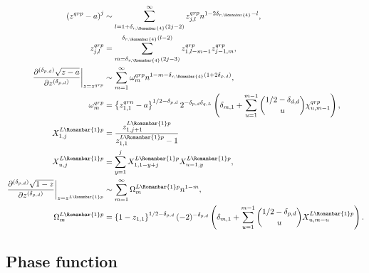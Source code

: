 \documentclass[11pt]{article}
\newcommand*{\Chi}{X}
\newcommand{\qg}{q}
\newcommand{\ql}{L}
\newcommand{\qj}{J}
\newcommand{\rg}{r}
\newcommand{\rb}{{\scriptsize \Romanbar{1}} }
\newcommand{\rl}{{\scriptsize \Romanbar{4}} }
\newcommand{\pg}{p}
\newcommand{\pn}{n}
\newcommand{\pd}{d}
\numberwithin{equation}{section}
\begin{document}
\begin{align}
	\left(z^{\qg\rg\pg} -a \right)^j & \sim \sum_{l=1 + \delta_{\rg,\rl}(2j-2)}^\infty z_{j,l}^{\qg\rg\pg} n^{1 -2\delta_{\rg,\rl} -l}, \\ %
	z_{j,l}^{\qg\rg\pg} & = \sum_{m=\delta_{\rg,\rl}(2j-3)}^{\delta_{\rg,\rl}(l-2)} z_{1,l-m-1}^{\qg\rg\pg}  z_{j-1,m}^{\qg\rg\pg}, \\
	\left.\frac{\partial^{(\delta_{\pg,\pd})} \sqrt{z-a}}{\partial z^{(\delta_{\pg,\pd})}}\right|_{z=z^{\qg\rg\pg}}   & \sim \sum_{m=1}^\infty \omega_m^{\qg\rg\pg}  n^{ 1 -m -\delta_{\rg,\rl} (1+2\delta_{\pg,\pd})}, \\ %
	\omega_m^{\qg\rg\pg} & = \left\{ z_{1,1}^{\qg\rg\pn} -a \right\}^{1/2 -\delta_{\pg,\pd}} 2^{-\delta_{\pg,\pd}\delta_{\qg,\ql} } \left( \delta_{m,1} + \sum_{u=1}^{m-1} {1/2-\delta_{\pd,\pd} \choose u} \chi_{u,m-1}^{\qg\rg\pg} \right), \\ %
	\Chi_{1,j}^{\ql\rb\pg} & = \frac{z_{1,j+1}^{\ql\rb\pg}}{z_{1,1}^{\ql\rb\pg}-1} \\
	\Chi_{u,j}^{\ql\rb\pg} & = \sum_{y=1}^{j} \Chi_{1,1-y+j}^{\ql\rb\pg} \Chi_{u-1,y}^{\ql\rb\pg}, \\
	\left.\frac{\partial^{(\delta_{\pg,\pd})} \sqrt{1-z} }{\partial z^{(\delta_{\pg,\pd})}}\right|_{z=z^{\ql\rb\pg}} & \sim \sum_{m=1}^\infty \Omega_m^{\ql\rb\pg} n^{1 -m}, \\
	\Omega_m^{\ql\rb\pg} & = \left\{1-z_{1,1}\right\}^{1/2 -\delta_{\pg,\pd}} (-2)^{-\delta_{\pg,\pd} }  \left(\delta_{m,1} + \sum_{u=1}^{m-1} {1/2 -\delta_{\pg,\pd} \choose u} \Chi_{u,m-u}^{\ql\rb\pg} \right).
\end{align}



\subsection{Phase function} \label{SquadrPhasefct}
\end{document}
